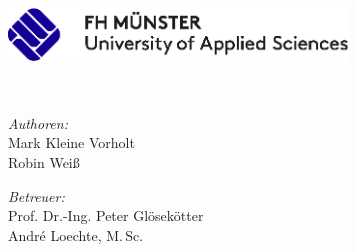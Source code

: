 
\begin{titlepage}
	\begin{center}
        \large  

        \hfill

        \vfill
        
        \includegraphics[width=9cm]{Figures/Logo-FH-Muenster} \\ \medskip
        
        \myDepartment
        
        \vfill

        \begingroup
            \color{Maroon}\spacedallcaps{\Large\myTitle} \\ \bigskip
        \endgroup

        \spacedlowsmallcaps{\myName}
        
        \vfill
        
        \begin{minipage}{0.4\textwidth}
			\begin{flushleft}
			\emph{Authoren:} \\
			Mark Kleine Vorholt\\
			Robin Wei\ss{}
			\end{flushleft}
			\end{minipage}
			\hfill
			\begin{minipage}{0.5\textwidth}
			\begin{flushright}
			\emph{Betreuer:} \\
			Prof. Dr.-Ing. Peter Glösekötter \\
			André Loechte, M.\,Sc.
			\end{flushright}
		\end{minipage}

        
        \vfill
        
        \textit{\mySubtitle} \\
            
        \vfill              
        
        \myTime   
        
        \vfill  

	\end{center}     
\end{titlepage}   